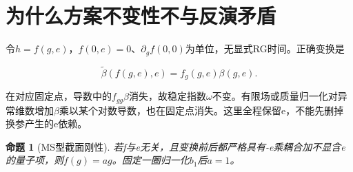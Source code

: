 \documentclass[11pt,a4paper,oneside]{ctexrep}
\theoremstyle{cnplain}
\newtheorem{proposition}[theorem]{命题}
\theoremstyle{definition}
\theoremstyle{remark}
\begin{document}
\section{为什么方案不变性不与反演矛盾}\label{sec:rg:6}

令\(h=f(g,e)\)，\(f(0,e)=0\)、\(\partial _g f(0,0)\)为单位，无显式RG时间。正确变换是

\begin{equation}
\widetilde\beta(f(g,e),e)=f_g(g,e)\beta(g,e).       \label{eq:rg:17}
\end{equation}

在对应固定点，导数中的\(f_{gg} \beta\)消失，故稳定指数\(\omega\)不变。有限场或质量归一化对异常维数增加\(\beta\)乘以某个对数导数，也在固定点消失。这里全程保留e，不能先删掉换参产生的e依赖。

\begin{proposition}[MS型截面刚性]

\label{thm:rg:6.1} 若f与e无关，且变换前后都严格具有-e乘耦合加不显含e的量子项，则\(f(g)=a g\)。固定一圈归一化\(b_1\)后\(a=1\)。

\end{proposition}
\end{document}

